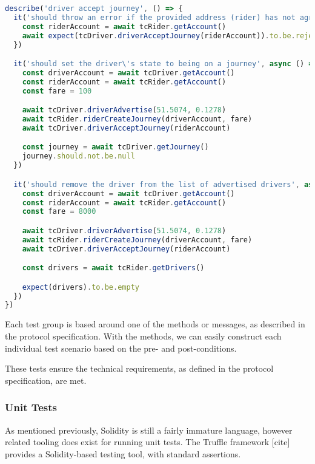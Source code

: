 \begin{lstlisting}[language=JavaScript]
describe('driver accept journey', () => {
  it('should throw an error if the provided address (rider) has not agreed to ride with the driver', async () => {
    const riderAccount = await tcRider.getAccount()
    await expect(tcDriver.driverAcceptJourney(riderAccount)).to.be.rejected
  })

  it('should set the driver\'s state to being on a journey', async () => {
    const driverAccount = await tcDriver.getAccount()
    const riderAccount = await tcRider.getAccount()
    const fare = 100

    await tcDriver.driverAdvertise(51.5074, 0.1278)
    await tcRider.riderCreateJourney(driverAccount, fare)
    await tcDriver.driverAcceptJourney(riderAccount)

    const journey = await tcDriver.getJourney()
    journey.should.not.be.null
  })

  it('should remove the driver from the list of advertised drivers', async () => {
    const driverAccount = await tcDriver.getAccount()
    const riderAccount = await tcRider.getAccount()
    const fare = 8000

    await tcDriver.driverAdvertise(51.5074, 0.1278)
    await tcRider.riderCreateJourney(driverAccount, fare)
    await tcDriver.driverAcceptJourney(riderAccount)

    const drivers = await tcRider.getDrivers()

    expect(drivers).to.be.empty
  })
})
\end{lstlisting}


Each test group is based around one of the methods or messages, as described in the protocol specification. With the methods, we can easily construct each individual test scenario based on the pre- and post-conditions.


These tests ensure the technical requirements, as defined in the protocol specification, are met.

\subsubsection{Unit Tests}


As mentioned previously, Solidity is still a fairly immature language, however related tooling does exist for running unit tests. The Truffle framework [cite] provides a Solidity-based testing tool, with standard assertions.

